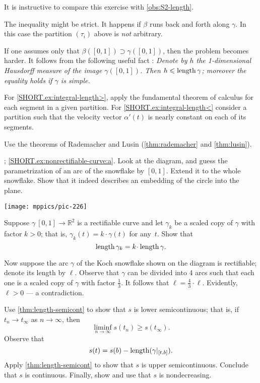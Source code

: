 \begin{multicols}{2}
It is instructive to compare this exercise with \ref{obs:S2-length}.

The inequality might be strict.
It happens if $\beta$ runs back and forth along $\gamma$.
In this case the partition $(\tau_i)$ above is \textit{not} arbitrary.

If one assumes only that $\beta([0,1])\supset\gamma([0,1])$, then the problem becomes harder.
It follows from the following useful fact \cite[2.6.1+2.6.2]{burago-burago-ivanov}:
\textit{Denote by $h$ the 1-dimensional Hausdorff measure of the image $\gamma([0,1])$.
Then $h\leqslant \mathop{\rm length}\nolimits\gamma$;
moreover the equality holds if $\gamma$ is simple.}

For \ref{SHORT.ex:integral-length>}, apply the fundamental theorem of calculus for each segment in a given partition.
For \ref{SHORT.ex:integral-length<} consider a partition such that the velocity vector $\alpha'(t)$ is nearly constant on each of its segments.

Use the theorems of Rademacher and Lusin (\ref{thm:rademacher} and \ref{thm:lusin}).

\parbf{\ref{ex:nonrectifiable-curve}}; \ref{SHORT.ex:nonrectifiable-curve:a}.
Look at the diagram, and guess the parametrization of an arc of the snowflake by $[0,1]$.
Extend it to the whole snowflake.
Show that it indeed describes an embedding of the circle into the plane.

\begin{Figure}
\vskip-0mm
\centering
\texttt{[image: mppics/pic-226]}
\vskip0mm
\end{Figure}

Suppose $\gamma\:[0,1]\to\mathbb{R}^2$ is a rectifiable curve and let $\gamma_k$ be a scaled copy of $\gamma$ with factor $k>0$;
that is, $\gamma_k(t)=k\cdot\gamma(t)$ for any~$t$.
Show that 
\[\length\gamma_k=k\cdot\length \gamma.\]

Now suppose the arc $\gamma$ of the Koch snowflake shown on the diagram is rectifiable; denote its length by $\ell$.
Observe that $\gamma$ can be divided into 4 arcs such that each one is a scaled copy of $\gamma$ with factor $\tfrac13$.
It follows that $\ell=\tfrac43\cdot\ell$.
Evidently, $\ell>0$ --- a contradiction.

Use \ref{thm:length-semicont} to show that $s$ is lower semicontinuous;
that is, if $t_n\to t_\infty$ as $n\to\infty$, then 
\[\liminf_{n\to\infty} s(t_n)\ge s(t_\infty).\]
Observe that
\[s(t)=s(b)-\mathop{\rm length}\nolimits(\gamma|_{[t,b]}).\]
Apply \ref{thm:length-semicont} to show that $s$ is upper semicontinuous.
Conclude that $s$ is continuous.
Finally, show and use that $s$ is nondecreasing.


\end{multicols}
